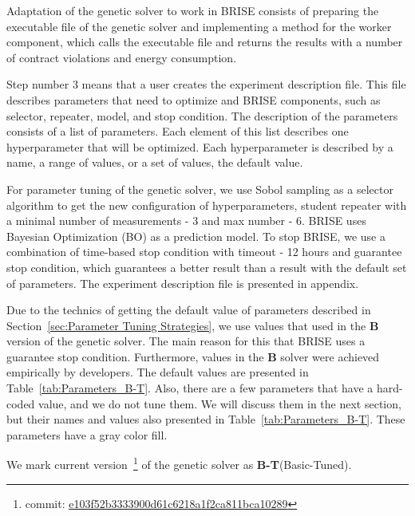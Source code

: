 Adaptation of the genetic solver to work in BRISE consists of preparing the executable file of the genetic solver and implementing a method for the worker component, which calls the executable file and returns the results with a number of contract violations and energy consumption.

Step number 3 means that a user creates the experiment description file. This file describes parameters that need to optimize and BRISE components, such as selector, repeater, model, and stop condition. The description of the parameters consists of a list of parameters. Each element of this list describes one hyperparameter that will be optimized. Each hyperparameter is described by a name, a range of values, or a set of values, the default value.

For parameter tuning of the genetic solver, we use Sobol sampling as a selector algorithm to get the new configuration of hyperparameters, student repeater with a minimal number of measurements - 3 and max number - 6. BRISE uses Bayesian Optimization (BO) as a prediction model.
To stop BRISE, we use a combination of time-based stop condition with timeout - 12 hours and guarantee stop condition, which guarantees a better result than a result with the default set of parameters. The experiment description file is presented in appendix.

Due to the technics of getting the default value of parameters described in Section~\ref{sec:Parameter Tuning Strategies}, we use values that used in the \textbf{B} version of the genetic solver. The main reason for this that BRISE uses a guarantee stop condition. Furthermore, values in the \textbf{B} solver were achieved empirically by developers. The default values are presented in Table~\ref{tab:Parameters_B-T}. Also, there are a few parameters that have a hard-coded value, and we do not tune them. We will discuss them in the next section, but their names and values also presented in Table~\ref{tab:Parameters_B-T}. These parameters have a gray color fill. 

We mark current version~\footnote{commit: \href{https://git-st.inf.tu-dresden.de/mquat/mquat2/commit/e103f52b3333900d61c6218a1f2ca811bca10289}{e103f52b3333900d61c6218a1f2ca811bca10289}} of the genetic solver as \textbf{B-T}(Basic-Tuned).


